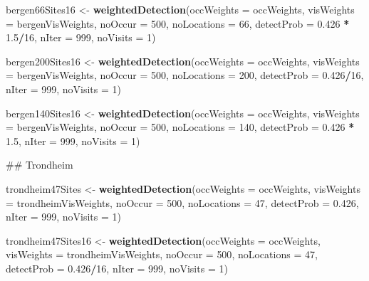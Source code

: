 \documentclass[]{article}
\newenvironment{Shaded}{\begin{snugshade}}{\end{snugshade}}
\newcommand{\KeywordTok}[1]{\textcolor[rgb]{0.13,0.29,0.53}{\textbf{#1}}}
\newcommand{\DataTypeTok}[1]{\textcolor[rgb]{0.13,0.29,0.53}{#1}}
\newcommand{\DecValTok}[1]{\textcolor[rgb]{0.00,0.00,0.81}{#1}}
\newcommand{\FloatTok}[1]{\textcolor[rgb]{0.00,0.00,0.81}{#1}}
\newcommand{\StringTok}[1]{\textcolor[rgb]{0.31,0.60,0.02}{#1}}
\newcommand{\OperatorTok}[1]{\textcolor[rgb]{0.81,0.36,0.00}{\textbf{#1}}}
\newcommand{\NormalTok}[1]{#1}
\begin{document}
\begin{Shaded}
\begin{Highlighting}[]
\NormalTok{bergen66Sites16 <-}\StringTok{ }\KeywordTok{weightedDetection}\NormalTok{(}\DataTypeTok{occWeights =}\NormalTok{ occWeights, }\DataTypeTok{visWeights =}\NormalTok{ bergenVisWeights, }
    \DataTypeTok{noOccur =} \DecValTok{500}\NormalTok{, }\DataTypeTok{noLocations =} \DecValTok{66}\NormalTok{, }\DataTypeTok{detectProb =} \FloatTok{0.426} \OperatorTok{*}\StringTok{ }\FloatTok{1.5}\OperatorTok{/}\DecValTok{16}\NormalTok{, }\DataTypeTok{nIter =} \DecValTok{999}\NormalTok{, }
    \DataTypeTok{noVisits =} \DecValTok{1}\NormalTok{)}

\NormalTok{bergen200Sites16 <-}\StringTok{ }\KeywordTok{weightedDetection}\NormalTok{(}\DataTypeTok{occWeights =}\NormalTok{ occWeights, }\DataTypeTok{visWeights =}\NormalTok{ bergenVisWeights, }
    \DataTypeTok{noOccur =} \DecValTok{500}\NormalTok{, }\DataTypeTok{noLocations =} \DecValTok{200}\NormalTok{, }\DataTypeTok{detectProb =} \FloatTok{0.426}\OperatorTok{/}\DecValTok{16}\NormalTok{, }\DataTypeTok{nIter =} \DecValTok{999}\NormalTok{, }\DataTypeTok{noVisits =} \DecValTok{1}\NormalTok{)}

\NormalTok{bergen140Sites16 <-}\StringTok{ }\KeywordTok{weightedDetection}\NormalTok{(}\DataTypeTok{occWeights =}\NormalTok{ occWeights, }\DataTypeTok{visWeights =}\NormalTok{ bergenVisWeights, }
    \DataTypeTok{noOccur =} \DecValTok{500}\NormalTok{, }\DataTypeTok{noLocations =} \DecValTok{140}\NormalTok{, }\DataTypeTok{detectProb =} \FloatTok{0.426} \OperatorTok{*}\StringTok{ }\FloatTok{1.5}\NormalTok{, }\DataTypeTok{nIter =} \DecValTok{999}\NormalTok{, }
    \DataTypeTok{noVisits =} \DecValTok{1}\NormalTok{)}




\NormalTok{## Trondheim}

\NormalTok{trondheim47Sites <-}\StringTok{ }\KeywordTok{weightedDetection}\NormalTok{(}\DataTypeTok{occWeights =}\NormalTok{ occWeights, }\DataTypeTok{visWeights =}\NormalTok{ trondheimVisWeights, }
    \DataTypeTok{noOccur =} \DecValTok{500}\NormalTok{, }\DataTypeTok{noLocations =} \DecValTok{47}\NormalTok{, }\DataTypeTok{detectProb =} \FloatTok{0.426}\NormalTok{, }\DataTypeTok{nIter =} \DecValTok{999}\NormalTok{, }\DataTypeTok{noVisits =} \DecValTok{1}\NormalTok{)}

\NormalTok{trondheim47Sites16 <-}\StringTok{ }\KeywordTok{weightedDetection}\NormalTok{(}\DataTypeTok{occWeights =}\NormalTok{ occWeights, }\DataTypeTok{visWeights =}\NormalTok{ trondheimVisWeights, }
    \DataTypeTok{noOccur =} \DecValTok{500}\NormalTok{, }\DataTypeTok{noLocations =} \DecValTok{47}\NormalTok{, }\DataTypeTok{detectProb =} \FloatTok{0.426}\OperatorTok{/}\DecValTok{16}\NormalTok{, }\DataTypeTok{nIter =} \DecValTok{999}\NormalTok{, }\DataTypeTok{noVisits =} \DecValTok{1}\NormalTok{)}


\end{Highlighting}
\end{Shaded}
\end{document}
